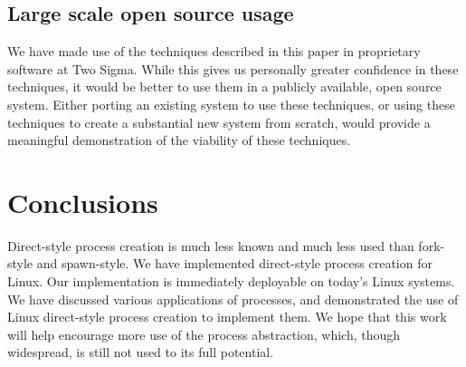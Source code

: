 \documentclass[sigplan]{acmart}
\begin{document}
\subsection{Large scale open source usage}
We have made use of the techniques described in this paper
in proprietary software at Two Sigma.
While this gives us personally greater confidence in these techniques,
it would be better to use them in a publicly available, open source system.
Either porting an existing system to use these techniques,
or using these techniques to create a substantial new system from scratch,
would provide a meaningful demonstration of the viability of these techniques.
\section{Conclusions}\label{conclusions}
Direct-style process creation is much less known and much less used than fork-style and spawn-style.
We have implemented direct-style process creation for Linux.
Our implementation is immediately deployable on today's Linux systems.
We have discussed various applications of processes,
and demonstrated the use of Linux direct-style process creation
to implement them.
We hope that this work will help encourage more use of the process abstraction,
which, though widespread,
is still not used to its full potential.



\end{document}
